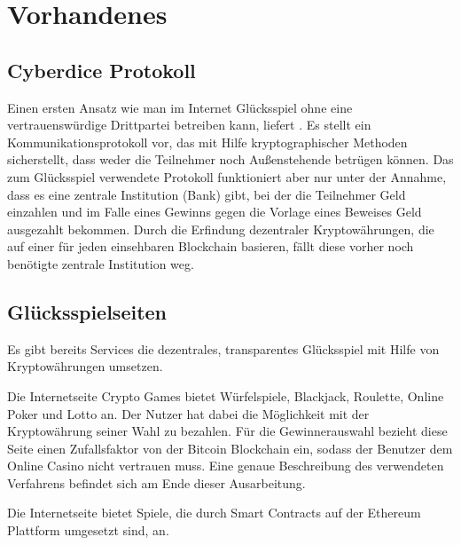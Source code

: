 \section{Vorhandenes}

\subsection{Cyberdice Protokoll}

Einen ersten Ansatz wie man im Internet Glücksspiel ohne eine vertrauenswürdige Drittpartei betreiben kann, liefert \cite{cyberdice_paper}. Es stellt ein Kommunikationsprotokoll vor, das mit Hilfe kryptographischer Methoden sicherstellt, dass weder die Teilnehmer noch Außenstehende betrügen können. Das zum Glücksspiel verwendete Protokoll funktioniert aber nur unter der Annahme, dass es eine zentrale Institution (Bank) gibt, bei der die Teilnehmer Geld einzahlen und im Falle eines Gewinns gegen die Vorlage eines Beweises Geld ausgezahlt bekommen.
\space
Durch die Erfindung dezentraler Kryptowährungen, die auf einer für jeden einsehbaren Blockchain basieren, fällt diese vorher noch benötigte zentrale Institution weg.


\subsection{Glücksspielseiten}


Es gibt bereits Services die dezentrales, transparentes Glücksspiel mit Hilfe von Kryptowährungen umsetzen.

Die Internetseite Crypto Games \cite{crypto_games} bietet Würfelspiele, Blackjack, Roulette, Online Poker und Lotto an. Der Nutzer hat dabei die Möglichkeit mit der Kryptowährung seiner Wahl zu bezahlen. Für die Gewinnerauswahl bezieht diese Seite einen Zufallsfaktor von der Bitcoin Blockchain ein, sodass der Benutzer dem Online Casino nicht vertrauen muss.
Eine genaue Beschreibung des verwendeten Verfahrens befindet sich am Ende dieser Ausarbeitung.

Die Internetseite \cite{vdice} bietet Spiele, die durch Smart Contracts auf der Ethereum Plattform umgesetzt sind, an.

